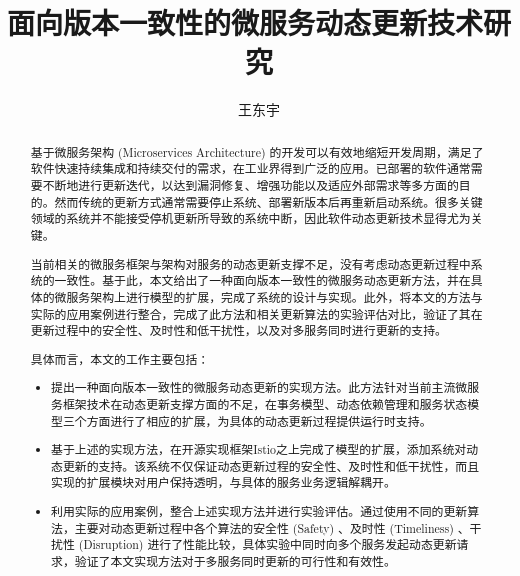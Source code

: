 \documentclass[macfonts,master]{njuthesis}
\title{面向版本一致性的微服务动态更新技术研究}
\author{王东宇}
\institute{南京大学}
\begin{document}
\renewcommand\labelitemi{{\boldmath$\cdot$}}


\maketitle
\makeenglishtitle


\frontmatter

\begin{abstract}
基于微服务架构 (Microservices Architecture) 的开发可以有效地缩短开发周期，满足了软件快速持续集成和持续交付的需求，在工业界得到广泛的应用。已部署的软件通常需要不断地进行更新迭代，以达到漏洞修复、增强功能以及适应外部需求等多方面的目的。然而传统的更新方式通常需要停止系统、部署新版本后再重新启动系统。很多关键领域的系统并不能接受停机更新所导致的系统中断，因此软件动态更新技术显得尤为关键。

当前相关的微服务框架与架构对服务的动态更新支撑不足，没有考虑动态更新过程中系统的一致性。基于此，本文给出了一种面向版本一致性的微服务动态更新方法，并在具体的微服务架构上进行模型的扩展，完成了系统的设计与实现。此外，将本文的方法与实际的应用案例进行整合，完成了此方法和相关更新算法的实验评估对比，验证了其在更新过程中的安全性、及时性和低干扰性，以及对多服务同时进行更新的支持。

具体而言，本文的工作主要包括：

\begin{itemize}
	\item 提出一种面向版本一致性的微服务动态更新的实现方法。此方法针对当前主流微服务框架技术在动态更新支撑方面的不足，在事务模型、动态依赖管理和服务状态模型三个方面进行了相应的扩展，为具体的动态更新过程提供运行时支持。
	\item 基于上述的实现方法，在开源实现框架Istio之上完成了模型的扩展，添加系统对动态更新的支持。该系统不仅保证动态更新过程的安全性、及时性和低干扰性，而且实现的扩展模块对用户保持透明，与具体的服务业务逻辑解耦开。
	\item 利用实际的应用案例，整合上述实现方法并进行实验评估。通过使用不同的更新算法，主要对动态更新过程中各个算法的安全性 (Safety) 、及时性 (Timeliness) 、干扰性 (Disruption) 进行了性能比较，具体实验中同时向多个服务发起动态更新请求，验证了本文实现方法对于多服务同时更新的可行性和有效性。
\end{itemize}

\end{abstract}
\end{document}
